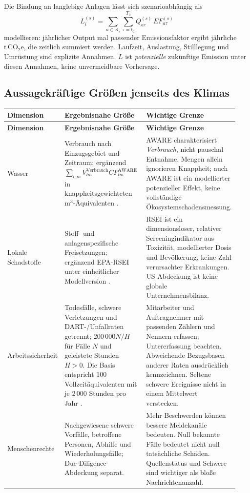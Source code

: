 \documentclass[11pt,a4paper]{article}
\newcommand{\tonnen}{\ensuremath{\mathrm{t\,CO}_{2}\mathrm{e}}}
\begin{document}
Die Bindung an langlebige Anlagen lässt sich szenarioabhängig als
\begin{equation}
L_i^{(s)}=\sum_{a\in\mathcal A_i}\sum_{\tau=t_0}^{T_a}Q_{a\tau}^{(s)}\,EF_{a\tau}^{(s)}
\end{equation}
modellieren: jährlicher Output mal passender Emissionsfaktor ergibt jährliche \tonnen, die zeitlich summiert werden. Laufzeit, Auslastung, Stilllegung und Umrüstung sind explizite Annahmen. $L$ ist \emph{potenzielle} zukünftige Emission unter diesen Annahmen, keine unvermeidbare Vorhersage.

\subsection{Aussagekräftige Größen jenseits des Klimas}
\small
\begin{longtable}{@{}P{0.20\linewidth}P{0.39\linewidth}P{0.35\linewidth}@{}}
\toprule
\textbf{Dimension} & \textbf{Ergebnisnahe Größe} & \textbf{Wichtige Grenze} \\
\midrule
\endfirsthead
\toprule
\textbf{Dimension} & \textbf{Ergebnisnahe Größe} & \textbf{Wichtige Grenze} \\
\midrule
\endhead
Wasser & Verbrauch nach Einzugsgebiet und Zeitraum; ergänzend $\sum_{l,m}V^{\mathrm{Verbrauch}}_{lm}CF^{\mathrm{AWARE}}_{lm}$ in knappheitsgewichteten m$^3$-Äquivalenten \cite{boulay2018}. & AWARE charakterisiert \emph{Verbrauch}, nicht pauschal Entnahme. Mengen allein ignorieren Knappheit; auch AWARE ist ein modellierter potenzieller Effekt, keine vollständige Ökosystemschadensmessung. \\
Lokale Schadstoffe & Stoff- und anlagenspezifische Freisetzungen; ergänzend EPA-RSEI unter einheitlicher Modellversion \cite{rsei}. & RSEI ist ein dimensionsloser, relativer Screeningindikator aus Toxizität, modellierter Dosis und Bevölkerung, keine Zahl verursachter Erkrankungen. US-Abdeckung ist keine globale Unternehmensbilanz. \\
Arbeitssicherheit & Todesfälle, schwere Verletzungen und DART-/Unfallraten getrennt; $200\,000N/H$ für Fälle $N$ und geleistete Stunden $H>0$. Die Basis entspricht 100 Vollzeitäquivalenten mit je 2\,000 Stunden pro Jahr \cite{bls}. & Mitarbeiter und Auftragnehmer mit passenden Zählern und Nennern erfassen; Untererfassung beachten. Abweichende Bezugsbasen anderer Raten ausdrücklich kennzeichnen. Seltene schwere Ereignisse nicht in einem Mittelwert verstecken. \\
Menschenrechte & Nachgewiesene schwere Vorfälle, betroffene Personen, Abhilfe und Wiederholungsfälle; Due-Diligence-Abdeckung separat. & Mehr Beschwerden können bessere Meldekanäle bedeuten. Null bekannte Fälle bedeutet nicht null tatsächliche Schäden. Quellenstatus und Schwere sind wichtiger als bloße Nachrichtenanzahl. \\

\end{longtable}
\end{document}
